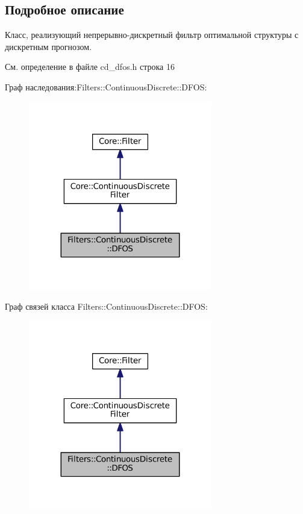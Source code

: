 \subsection{Подробное описание}
Класс, реализующий непрерывно-\/дискретный фильтр оптимальной структуры с дискретным прогнозом. 

См. определение в файле cd\+\_\+dfos.\+h строка 16



Граф наследования\+:Filters\+:\+:Continuous\+Discrete\+:\+:D\+F\+OS\+:\nopagebreak
\begin{figure}[H]
\begin{center}
\leavevmode
\includegraphics[width=227pt]{class_filters_1_1_continuous_discrete_1_1_d_f_o_s__inherit__graph}
\end{center}
\end{figure}


Граф связей класса Filters\+:\+:Continuous\+Discrete\+:\+:D\+F\+OS\+:\nopagebreak
\begin{figure}[H]
\begin{center}
\leavevmode
\includegraphics[width=227pt]{class_filters_1_1_continuous_discrete_1_1_d_f_o_s__coll__graph}
\end{center}
\end{figure}


